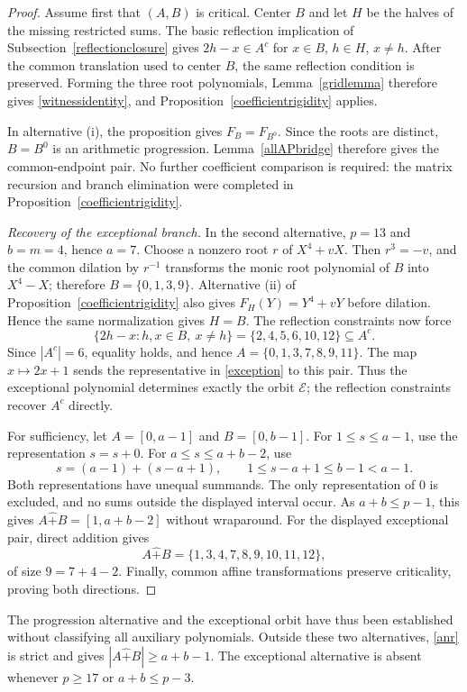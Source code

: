 \documentclass[12pt]{article}
\theoremstyle{remark}
\newcommand{\rs}{\mathbin{\widehat+}}
\begin{document}
\begin{proof}
Assume first that $(A,B)$ is critical.  Center $B$ and let $H$ be the
halves of the missing restricted sums.  The basic reflection implication
of Subsection~\ref{reflectionclosure} gives
$2h-x\in A^c$ for $x\in B$, $h\in H$, $x\ne h$.  After the common
translation used to center $B$, the same reflection condition is
preserved.  Forming the three root polynomials, Lemma~\ref{gridlemma}
therefore gives \eqref{witnessidentity}, and
Proposition~\ref{coefficientrigidity} applies.

In alternative \textup{(i)}, the proposition gives $F_B=F_{B^0}$.
Since the roots are distinct, $B=B^0$ is an arithmetic progression.
Lemma~\ref{allAPbridge} therefore gives the common-endpoint pair.
No further coefficient comparison is required: the matrix recursion
and branch elimination were completed in
Proposition~\ref{coefficientrigidity}.

\emph{Recovery of the exceptional branch.}
In the second alternative, $p=13$ and $b=m=4$, hence $a=7$.  Choose a
nonzero root $r$ of $X^4+vX$.  Then $r^3=-v$, and the common dilation
by $r^{-1}$ transforms the monic root polynomial of $B$ into $X^4-X$;
therefore $B=\{0,1,3,9\}$.  Alternative \textup{(ii)} of Proposition~\ref{coefficientrigidity}
also gives $F_H(Y)=Y^4+vY$ before dilation.  Hence the same normalization
gives $H=B$.
The reflection constraints now force
\[
 \{2h-x:h,x\in B,\ x\ne h\}
       =\{2,4,5,6,10,12\}\subseteq A^c.
\]
Since $|A^c|=6$, equality holds, and hence
$A=\{0,1,3,7,8,9,11\}$.  The map $x\mapsto2x+1$ sends the representative in \eqref{exception}
to this pair.  Thus the exceptional polynomial determines exactly the orbit
$\mathcal E$; the reflection constraints recover $A^c$ directly.

For sufficiency, let $A=[0,a-1]$ and $B=[0,b-1]$.
For $1\le s\le a-1$, use the representation $s=s+0$.
For $a\le s\le a+b-2$, use
\[
 s=(a-1)+(s-a+1),\qquad 1\le s-a+1\le b-1<a-1.
\]
Both representations have unequal summands.  The only representation of $0$ is excluded,
and no sums outside the displayed interval occur.  As $a+b\le p-1$, this gives
$A\rs B=[1,a+b-2]$ without wraparound.  For the displayed exceptional
pair, direct addition gives
\[
 A\rs B=\{1,3,4,7,8,9,10,11,12\},
\]
of size $9=7+4-2$.  Finally, common affine transformations preserve
criticality, proving both directions.
\end{proof}

The progression alternative and the exceptional orbit have thus been
established without classifying all auxiliary polynomials.  Outside
these two alternatives, \eqref{anr} is strict and gives
$|A\rs B|\ge a+b-1$.  The exceptional alternative is absent whenever
$p\ge17$ or $a+b\le p-3$.
\end{document}
